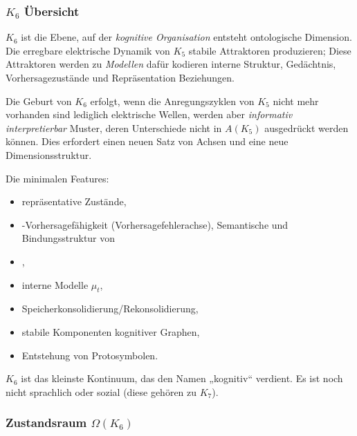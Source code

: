 

\subsubsection{\texorpdfstring{$K_6$}{K_6} Übersicht}
\label{sec:k6-overview}

$K_6$ ist die Ebene, auf der \emph{kognitive Organisation} entsteht
ontologische Dimension. Die erregbare elektrische Dynamik von $K_5$
stabile Attraktoren produzieren; Diese Attraktoren werden zu \emph{Modellen} dafür
kodieren interne Struktur, Gedächtnis, Vorhersagezustände und Repräsentation
Beziehungen.

Die Geburt von $K_6$ erfolgt, wenn die Anregungszyklen von $K_5$ nicht mehr vorhanden sind
lediglich elektrische Wellen, werden aber \emph{informativ interpretierbar}
Muster, deren Unterschiede nicht in $A(K_5)$ ausgedrückt werden können. Dies
erfordert einen neuen Satz von Achsen und eine neue Dimensionsstruktur.

Die minimalen Features:
\begin{itemize}
    \item repräsentative Zustände,
    \item-Vorhersagefähigkeit (Vorhersagefehlerachse),
    Semantische und Bindungsstruktur von \item,
    \item interne Modelle $\mu_t$,
    \item Speicherkonsolidierung/Rekonsolidierung,
    \item stabile Komponenten kognitiver Graphen,
    \item Entstehung von Protosymbolen.
\end{itemize}

$K_6$ ist das kleinste Kontinuum, das den Namen „kognitiv“ verdient. Es
ist noch nicht sprachlich oder sozial (diese gehören zu $K_7$).

\subsubsection{Zustandsraum \texorpdfstring{$\Omega(K_6)$}{\Omega(K_6)}}

